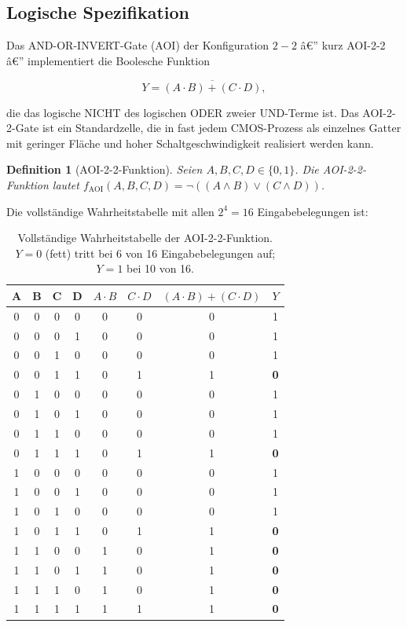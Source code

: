 ﻿\documentclass[12pt,a4paper]{report}
\newtheorem{definition}{Definition}[section]
\begin{document}
\subsection{Logische Spezifikation}

Das AND-OR-INVERT-Gate (AOI) der Konfiguration $2{-}2$ â€” kurz AOI-2-2 â€”
implementiert die Boolesche Funktion

\begin{equation}
    Y = \overline{(A \cdot B) + (C \cdot D)},
    \label{eq:aoi22}
\end{equation}

die das logische NICHT des logischen ODER zweier UND-Terme ist.
Das AOI-2-2-Gate ist ein Standardzelle, die in fast jedem CMOS-Prozess
als einzelnes Gatter mit geringer Fläche und hoher Schaltgeschwindigkeit
realisiert werden kann.

\begin{definition}[AOI-2-2-Funktion]
Seien $A, B, C, D \in \{0, 1\}$. Die AOI-2-2-Funktion lautet
$f_{\mathrm{AOI}}(A, B, C, D) = \neg((A \wedge B) \vee (C \wedge D))$.
\end{definition}

Die vollständige Wahrheitstabelle mit allen $2^4 = 16$ Eingabebelegungen ist:

\begin{table}[H]
\centering
\small
\begin{tabular}{|c|c|c|c||c|c|c||c|}
\hline
\textbf{A} & \textbf{B} & \textbf{C} & \textbf{D} & $A \cdot B$ & $C \cdot D$ & $(A \cdot B)+(C \cdot D)$ & $Y$ \\
\hline
0&0&0&0&0&0&0&1\\
0&0&0&1&0&0&0&1\\
0&0&1&0&0&0&0&1\\
0&0&1&1&0&1&1&\textbf{0}\\
0&1&0&0&0&0&0&1\\
0&1&0&1&0&0&0&1\\
0&1&1&0&0&0&0&1\\
0&1&1&1&0&1&1&\textbf{0}\\
1&0&0&0&0&0&0&1\\
1&0&0&1&0&0&0&1\\
1&0&1&0&0&0&0&1\\
1&0&1&1&0&1&1&\textbf{0}\\
1&1&0&0&1&0&1&\textbf{0}\\
1&1&0&1&1&0&1&\textbf{0}\\
1&1&1&0&1&0&1&\textbf{0}\\
1&1&1&1&1&1&1&\textbf{0}\\
\hline
\end{tabular}
\caption{Vollständige Wahrheitstabelle der AOI-2-2-Funktion. $Y=0$ (fett) tritt
bei 6 von 16 Eingabebelegungen auf; $Y=1$ bei 10 von 16.}
\label{tab:aoi_wahrheit}
\end{table}
\end{document}
